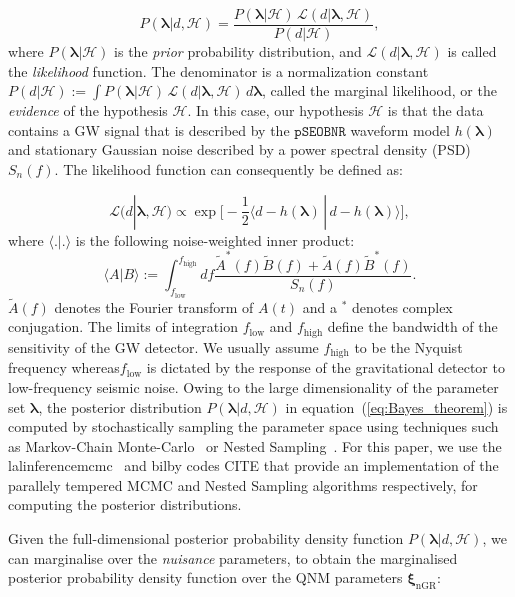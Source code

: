 \documentclass[twocolumn,prd,superscriptaddress,amsfonts,amssymb,amsmath,preprintnumbers]{revtex4-1}
\newcommand{\blambda}{\bm{\lambda}}
\newcommand{\bxingr}{\bm{\xi}_{\text{nGR}}}
\newcommand{\pSEOB}{\texttt{pSEOBNR}}
\begin{document}
\begin{equation}
P(\blambda | d, \mathcal{H}) = \frac{P(\blambda | \mathcal{H}) \, \mathcal{L}(d | \blambda, \mathcal{H})}{P(d|\mathcal{H})},
\label{eq:Bayes_theorem}
\end{equation}
where $P(\blambda | \mathcal{H})$ is the \emph{prior} probability distribution, and $\mathcal{L}(d | \blambda, \mathcal{H})$ is called the \emph{likelihood} function. The denominator is a normalization constant $P(d|\mathcal{H}) := \int P(\blambda | \mathcal{H}) \, \mathcal{L}(d | \blambda, \mathcal{H}) \, d\blambda$, called the marginal likelihood, or the \emph{evidence} of the hypothesis $\mathcal{H}$. In this case, our hypothesis $\mathcal{H}$ is that the data contains a GW signal that is described by the $\pSEOB$ waveform model $h(\blambda)$  and stationary Gaussian noise described by a power spectral density (PSD) $S_n(f)$. The likelihood function can consequently be defined as:

\begin{equation}
\mathcal{L}(d | \blambda, \mathcal{H}) \propto \exp\big[-\frac{1}{2} \langle d - h(\blambda) \, | \, d -h(\blambda) \rangle \big],
\label{eq:likelihood}\end{equation}
where $\langle . | . \rangle$ is the following noise-weighted inner product:
\begin{equation}
\langle A | B \rangle := \int_{f_\mathrm{low}} ^{f_\mathrm{high}} df \frac{\tilde{A}^*(f)\tilde{B}(f) + \tilde{A}(f)\tilde{B}^*(f)}{S_n(f)}.
\label{eq:nwip}
\end{equation}
$\tilde{A}(f)$ denotes the Fourier transform of $A(t)$ and a $^*$ denotes complex conjugation. The limits of integration ${f_\mathrm{low}}$ and ${f_\mathrm{high}}$ define the bandwidth of the sensitivity of the GW detector. We usually assume ${f_\mathrm{high}}$ to be the Nyquist frequency whereas${f_\mathrm{low}}$ is dictated by the response of the gravitational detector to low-frequency seismic noise. Owing to the large dimensionality of the parameter set $\blambda$, the posterior distribution $P(\blambda | d, \mathcal{H})$ in equation~(\ref{eq:Bayes_theorem}) is computed by stochastically sampling the parameter space using techniques such as Markov-Chain Monte-Carlo~\cite{xxx} or Nested Sampling~\cite{xxx}. For this paper, we use the lalinferencemcmc~\cite{xx} and bilby codes CITE that provide an implementation of the parallely tempered MCMC and Nested Sampling algorithms respectively, for computing the posterior distributions. 

Given the full-dimensional posterior probability density function $P(\blambda | d, \mathcal{H})$, we can marginalise over the \emph{nuisance} parameters, to obtain the marginalised posterior probability density function over the QNM parameters $\bxingr$:
\end{document}

